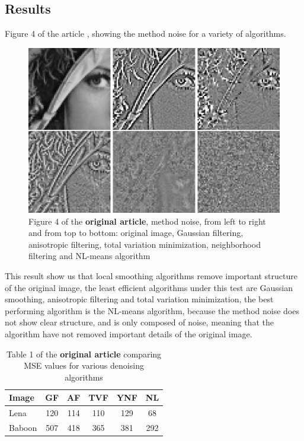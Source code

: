 \documentclass[a4paper, twocolumn, twoside]{article}
\begin{document}
\subsection{Results}
Figure 4 of the article \cite{nlmeans}, showing the method noise for a variety of algorithms.
\begin{figure}[H]
	\begin{center}
		\includegraphics[width=\columnwidth]{images/method_noise_result.png}
	\end{center}
	\caption{Figure 4 of the \textbf{original article}, method noise, from left to right and from top to bottom: original image,
	Gaussian filtering, anisotropic filtering, total variation minimization, neighborhood filtering and NL-means algorithm}\label{fig:3}
\end{figure}
This result show us that local smoothing algorithms remove important structure of the original image,
the least efficient algorithms under this test are Gaussian smoothing, anisotropic filtering and total variation minimization,
the best performing algorithm is the NL-means algorithm, because the method noise does not show clear structure, and is
only composed of noise, meaning that the algorithm have not removed important details of the original image.\\
\begin{table}[H]
\centering
\begin{tabular}{|l|c|c|c|c|c|}
\hline
Image & GF & AF & TVF & YNF & NL \\
\hline
Lena & 120 & 114 & 110 & 129 & 68 \\
Baboon & 507 & 418 & 365 & 381 & 292 \\
\hline
\end{tabular}
\caption{Table 1 of the \textbf{original article} comparing MSE values for various denoising algorithms}
\label{tab:my_label}
\end{table}
\end{document}
